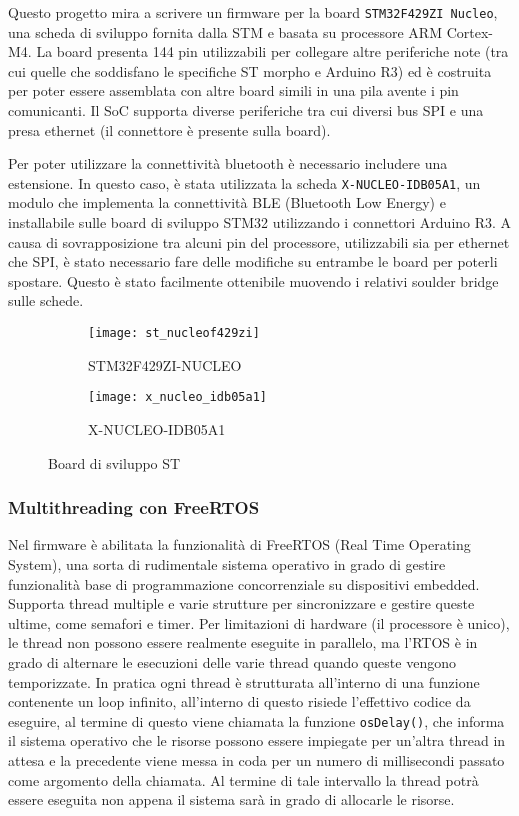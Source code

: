 
Questo progetto mira a scrivere un firmware per la board \texttt{STM32F429ZI Nucleo}, una scheda di sviluppo fornita dalla STM e basata su processore ARM Cortex-M4. La board presenta 144 pin utilizzabili per collegare altre periferiche note (tra cui quelle che soddisfano le specifiche ST morpho e Arduino R3) ed \`e costruita per poter essere assemblata con altre board simili in una pila avente i pin comunicanti. Il SoC supporta diverse periferiche tra cui diversi bus SPI e una presa ethernet (il connettore \`e presente sulla board).

Per poter utilizzare la connettivit\`a bluetooth \`e necessario includere una estensione. In questo caso, \`e stata utilizzata la scheda \texttt{X-NUCLEO-IDB05A1}, un modulo che implementa la connettivit\`a BLE (Bluetooth Low Energy) e installabile sulle board di sviluppo STM32 utilizzando i connettori Arduino R3. A causa di sovrapposizione tra alcuni pin del processore, utilizzabili sia per ethernet che SPI, \`e stato necessario fare delle modifiche su entrambe le board per poterli spostare. Questo \`e stato facilmente ottenibile muovendo i relativi soulder bridge sulle schede.

\begin{figure}[h]
  \center
  \begin{subfigure}{.45\textwidth}
    \texttt{[image: st\_nucleof429zi]}
    \caption{STM32F429ZI-NUCLEO}
  \end{subfigure}
  \hfill
  \begin{subfigure}{.45\textwidth}
    \texttt{[image: x\_nucleo\_idb05a1]}
    \caption{X-NUCLEO-IDB05A1}
  \end{subfigure}
  \caption{Board di sviluppo ST}
  \label{fig:boards}
\end{figure}

\subsubsection{Multithreading con FreeRTOS}

Nel firmware \`e abilitata la funzionalit\`a di FreeRTOS (Real Time Operating System), una sorta di rudimentale sistema operativo in grado di gestire funzionalit\`a base di programmazione concorrenziale su dispositivi embedded. Supporta thread multiple e varie strutture per sincronizzare e gestire queste ultime, come semafori e timer. Per limitazioni di hardware (il processore \`e unico), le thread non possono essere realmente eseguite in parallelo, ma l'RTOS \`e in grado di alternare le esecuzioni delle varie thread quando queste vengono temporizzate. In pratica ogni thread \`e strutturata all'interno di una funzione contenente un loop infinito, all'interno di questo risiede l'effettivo codice da eseguire, al termine di questo viene chiamata la funzione \texttt{osDelay()}, che informa il sistema operativo che le risorse possono essere impiegate per un'altra thread in attesa e la precedente viene messa in coda per un numero di millisecondi passato come argomento della chiamata. Al termine di tale intervallo la thread potr\`a essere eseguita non appena il sistema sar\`a in grado di allocarle le risorse.


